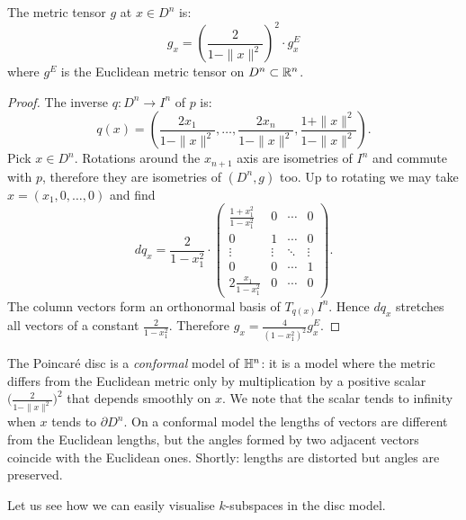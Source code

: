 \begin{prop}
The metric tensor $g$ at $x\in D^n$ is:
$$g_x = \left( \frac 2 {1-\|x\|^2}\right)^2 \cdot g^E_x$$
where $g^E$ is the Euclidean metric tensor on $D^n \subset \mathbb{R}^n$.
\end{prop}
\begin{proof}
The inverse $q\colon D^n \to I^n$ of $p$ is:
$$q(x) = \left( \frac{2x_1}{1-\|x\|^2}, \ldots, \frac{2x_n}{1-\|x\|^2}, \frac{1+\|x\|^2}{1-\|x\|^2}\right).$$
Pick $x\in D^n$. Rotations around the $x_{n+1}$ axis are isometries of $I^n$ and commute with $p$, therefore they are isometries of $(D^n, g)$ too. Up to rotating we may take
$x = (x_1,0,\ldots, 0)$ and
find
$$dq_x = 
\frac {2}{1-x_1^2} \cdot
\begin{pmatrix}
\frac{1+x_1^2}{1-x_1^2} & 0 & \cdots & 0 \\
0 & 1 & \cdots & 0 \\
\vdots & \vdots & \ddots & \vdots \\
0 & 0 & \cdots & 1 \\
2\frac{x_1}{1-x_1^2} & 0 & \cdots & 0
\end{pmatrix}.
$$
The column vectors form an orthonormal basis of $T_{q(x)}I^n$. Hence $dq_x$  stretches all vectors of a constant $\frac 2{1-x_1^2}$. Therefore $g_x =\frac 4{(1-x_1^2)^2} g^E_x$. 
\end{proof}

The Poincar\'e disc is a \emph{conformal} model of $\mathbb{H}^n$: it is a model where the metric differs from the Euclidean metric only by multiplication by a positive scalar $\big(\frac 2{1-\|x\|^2}\big)^2$ that depends smoothly on $x$. We note that the scalar tends to infinity when $x$ tends to $\partial D^n$. On a conformal model the lengths of vectors are different from the Euclidean lengths, but the angles formed by two adjacent vectors coincide with the Euclidean ones. Shortly: lengths are distorted but angles are preserved. 

Let us see how we can easily visualise $k$-subspaces in the disc model.

